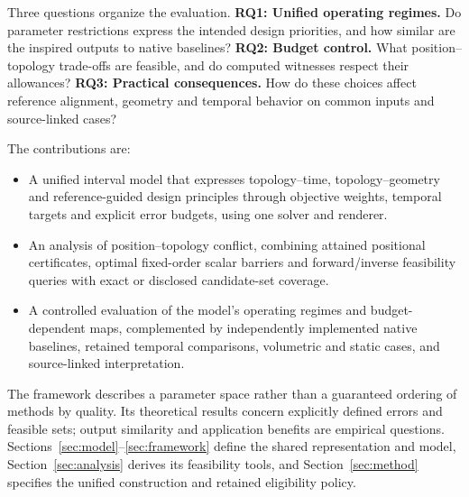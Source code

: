 Three questions organize the evaluation. \textbf{RQ1: Unified operating regimes.} Do parameter restrictions express the intended design priorities, and how similar are the inspired outputs to native baselines? \textbf{RQ2: Budget control.} What position--topology trade-offs are feasible, and do computed witnesses respect their allowances? \textbf{RQ3: Practical consequences.} How do these choices affect reference alignment, geometry and temporal behavior on common inputs and source-linked cases?

The contributions are:
\begin{itemize}
\item A unified interval model that expresses topology--time, topology--geometry and reference-guided design principles through objective weights, temporal targets and explicit error budgets, using one solver and renderer.
\item An analysis of position--topology conflict, combining attained positional certificates, optimal fixed-order scalar barriers and forward/inverse feasibility queries with exact or disclosed candidate-set coverage.
\item A controlled evaluation of the model's operating regimes and budget-dependent maps, complemented by independently implemented native baselines, retained temporal comparisons, volumetric and static cases, and source-linked interpretation.
\end{itemize}
The framework describes a parameter space rather than a guaranteed ordering of methods by quality. Its theoretical results concern explicitly defined errors and feasible sets; output similarity and application benefits are empirical questions. Sections~\ref{sec:model}--\ref{sec:framework} define the shared representation and model, Section~\ref{sec:analysis} derives its feasibility tools, and Section~\ref{sec:method} specifies the unified construction and retained eligibility policy.

